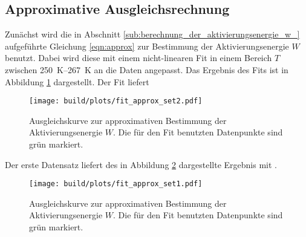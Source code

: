 \subsection{Approximative Ausgleichsrechnung}
\label{subsec:approx}
Zunächst wird die in Abschnitt \ref{sub:berechnung_der_aktivierungsenergie_w_}
aufgeführte Gleichung \ref{eqn:approx} zur Bestimmung der Aktivierungsenergie
$W$ benutzt. Dabei wird diese mit einem nicht-linearen Fit in einem Bereich
$T$ zwischen \SIrange{250}{267}{\kelvin} an die Daten angepasst.
Das Ergebnis des Fits ist in Abbildung \ref{fig:fit_approx_set2} dargestellt.
Der Fit liefert
\begin{equation*}
    
\end{equation*}
\begin{figure}
    \centering
    \texttt{[image: build/plots/fit\_approx\_set2.pdf]}
    \caption{Ausgleichskurve zur approximativen Bestimmung der
    Aktivierungsenergie $W$. Die für den Fit benutzten Datenpunkte
    sind grün markiert.}
    \label{fig:fit_approx_set2}
\end{figure}
Der erste Datensatz liefert des in Abbildung \ref{fig:fit_approx_set1}
dargestellte Ergebnis mit $$.
\begin{figure}
    \centering
    \texttt{[image: build/plots/fit\_approx\_set1.pdf]}
    \caption{Ausgleichskurve zur approximativen Bestimmung der
    Aktivierungsenergie $W$. Die für den Fit benutzten Datenpunkte
    sind grün markiert.}
    \label{fig:fit_approx_set1}
\end{figure}

